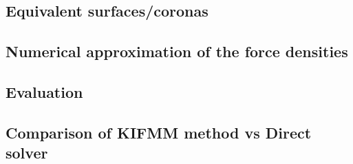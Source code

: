\subsection{Equivalent surfaces/coronas}
\subsection{Numerical approximation of the force densities}
\subsection{Evaluation}
\subsection{Comparison of KIFMM method vs Direct solver}
